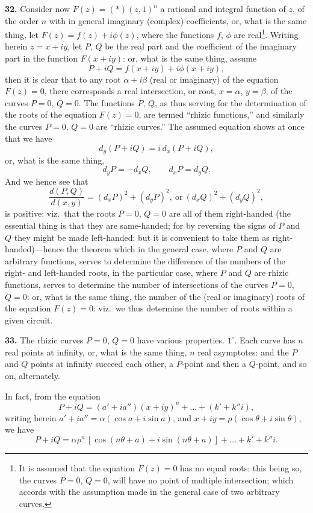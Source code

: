 \documentclass[11pt,a4paper]{article}
\begin{document}
\noindent\textbf{32.} Consider now $F(z) = (\ast)(z, 1)^{n}$ a rational and integral function of $z$, of the order $n$ with in general imaginary (complex) coefficients, or, what is the same thing, let $F(z) = f(z) + i\phi(z)$, where the functions $f$, $\phi$ are real\footnote{It is assumed that the equation $F(z)=0$ has no equal roots: this being so, the curves $P=0$, $Q=0$, will have no point of multiple intersection; which accords with the assumption made in the general case of two arbitrary curves.}. Writing herein $z = x + iy$, let $P$, $Q$ be the real part and the coefficient of the imaginary part in the function $F(x+iy)$: or, what is the same thing, assume
\[
P + iQ = f(x+iy) + i\phi(x+iy),
\]
then it is clear that to any root $\alpha + i\beta$ (real or imaginary) of the equation $F(z)=0$, there corresponds a real intersection, or root, $x=\alpha$, $y=\beta$, of the curves $P=0$, $Q=0$. The functions $P$, $Q$, as thus serving for the determination of the roots of the equation $F(z)=0$, are termed ``rhizic functions,'' and similarly the curves $P=0$, $Q=0$ are ``rhizic curves.'' The assumed equation shows at once that we have
\[
d_{y}(P+iQ) = i\, d_{x}(P+iQ),
\]
or, what is the same thing,
\[
d_{y}P = -d_{x}Q,\qquad d_{x}P = d_{y}Q.
\]
And we hence see that
\[
\frac{d(P,Q)}{d(x,y)} = (d_{x}P)^{2} + (d_{y}P)^{2},\ \text{or}\ (d_{x}Q)^{2} + (d_{y}Q)^{2},
\]
is positive: viz.\ that the roots $P=0$, $Q=0$ are all of them right-handed (the essential thing is that they are same-handed; for by reversing the signs of $P$ and $Q$ they might be made left-handed: but it is convenient to take them as right-handed)---hence the theorem which in the general case, where $P$ and $Q$ are arbitrary functions, serves to determine the difference of the numbers of the right- and left-handed roots, in the particular case, where $P$ and $Q$ are rhizic functions, serves to determine the number of intersections of the curves $P=0$, $Q=0$: or, what is the same thing, the number of the (real or imaginary) roots of the equation $F(z)=0$: viz.\ we thus determine the number of roots within a given circuit.

\medskip

\noindent\textbf{33.} The rhizic curves $P=0$, $Q=0$ have various properties. $1^{\circ}$. Each curve has $n$ real points at infinity, or, what is the same thing, $n$ real asymptotes: and the $P$ and $Q$ points at infinity succeed each other, a $P$-point and then a $Q$-point, and so on, alternately.

In fact, from the equation
\[
P + iQ = (a' + ia'')(x+iy)^{n} + \ldots + (k' + k''i),
\]
writing herein $a' + ia'' = \alpha(\cos a + i\sin a)$, and $x + iy = \rho(\cos\theta + i\sin\theta)$, we have
\[
P + iQ = \alpha\rho^{n}\,[\cos(n\theta + a) + i\sin(n\theta + a)] + \ldots + k' + k''i.
\]
\end{document}

